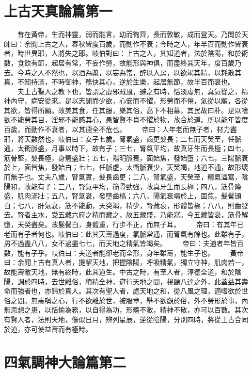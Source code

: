 \section{上古天真論篇第一}

　　昔在黃帝，生而神靈，弱而能言，幼而徇齊，長而敦敏，成而登天。乃問於天師曰：余聞上古之人，春秋皆度百歲，而動作不衰；今時之人，年半百而動作皆衰者，時世異耶，人將失之耶。岐伯對曰：上古之人，其知道者，法於陰陽，和於術數，食飲有節，起居有常，不妄作勞，故能形與神俱，而盡終其天年，度百歲乃去。今時之人不然也，以酒為漿，以妄為常，醉以入房，以欲竭其精，以耗散其真，不知持滿，不時御神，務快其心，逆於生樂，起居無節，故半百而衰也。
　　夫上古聖人之教下也，皆謂之虛邪賊風，避之有時，恬淡虛無，真氣從之，精神內守，病安從來。是以志閒而少欲，心安而不懼，形勞而不倦，氣從以順，各從其欲，皆得所願。故美其食，任其服，樂其俗，高下不相慕，其民故曰朴。是以嗜欲不能勞其目，淫邪不能惑其心，愚智賢不肖不懼於物，故合於道。所以能年皆度百歲，而動作不衰者，以其德全不危也。
　　帝曰：人年老而無子者，材力盡耶，將天數然也。岐伯曰：女子七歲。腎氣盛，齒更髮長；二七而天癸至，任脈通，太衝脈盛，月事以時下，故有子；三七，腎氣平均，故真牙生而長極；四七，筋骨堅，髮長極，身體盛壯；五七，陽明脈衰，面始焦，發始墮；六七，三陽脈衰於上，面皆焦，發始白；七七，任脈虛，太衝脈衰少，天癸竭，地道不通，故形壞而無子也。丈夫八歲，腎氣實，髮長齒更；二八，腎氣盛，天癸至，精氣溢寫，陰陽和，故能有子；三八，腎氣平均，筋骨勁強，故真牙生而長極；四八，筋骨隆盛，肌肉滿壯；五八，腎氣衰，發墮齒槁；六八，陽氣衰竭於上，面焦，髮鬢頒白；七八，肝氣衰，筋不能動，天癸竭，精少，腎藏衰，形體皆極；八八，則齒發去。腎者主水，受五藏六府之精而藏之，故五藏盛，乃能寫。今五藏皆衰，筋骨解墮，天癸盡矣。故髮鬢白，身體重，行步不正，而無子耳。
　　帝曰：有其年已老而有子者何也。岐伯曰：此其天壽過度，氣脈常通，而腎氣有餘也。此雖有子，男不過盡八八，女不過盡七七，而天地之精氣皆竭矣。
　　帝曰：夫道者年皆百數，能有子乎。岐伯曰：夫道者能卻老而全形，身年雖壽，能生子也。
　　黃帝曰：余聞上古有真人者，提挈天地，把握陰陽，呼吸精氣，獨立守神，肌肉若一，故能壽敝天地，無有終時，此其道生。中古之時，有至人者，淳德全道，和於陰陽，調於四時，去世離俗，積精全神，遊行天地之間，視聽八達之外，此蓋益其壽命而強者也，亦歸於真人。其次有聖人者，處天地之和，從八風之理，適嗜欲於世俗之間。無恚嗔之心，行不欲離於世，被服章，舉不欲觀於俗，外不勞形於事，內無思想之患，以恬愉為務，以自得為功，形體不敝，精神不散，亦可以百數。其次有賢人者，法則天地，像似日月，辨列星辰，逆從陰陽，分別四時，將從上古合同於道，亦可使益壽而有極時。


\section{四氣調神大論篇第二}

